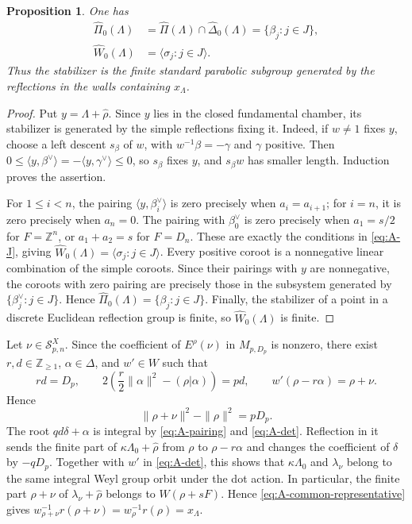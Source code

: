 \documentclass[11pt,a4paper]{amsart}
\newcommand{\ZZ}{\mathbb Z}
\theoremstyle{plain}
\newtheorem{prop}[theorem]{Proposition}
\numberwithin{equation}{section}
\newenvironment{pf}{\begin{proof}}{\end{proof}}
\begin{document}
\begin{prop}\label{prop:A-stabilizer}
One has
\[
\begin{aligned}
\widehat\Pi_0(\Lambda)
&=\widehat\Pi(\Lambda)\cap\widehat\Delta_0(\Lambda)
=\{\beta_j:j\in J\},\\
\widehat W_0(\Lambda)&=\langle\sigma_j:j\in J\rangle.
\end{aligned}
\]
Thus the stabilizer is the finite standard parabolic subgroup
generated by the reflections in the walls containing \(x_\Lambda\).
\end{prop}
\begin{pf}
Put \(y=\Lambda+\widehat\rho\). Since \(y\) lies in the closed
fundamental chamber, its stabilizer is generated by the simple
reflections fixing it. Indeed, if \(w\ne1\) fixes \(y\), choose
a left descent \(s_\beta\) of \(w\), with
\(w^{-1}\beta=-\gamma\) and \(\gamma\) positive. Then
\(0\le\langle y,\beta^\vee\rangle
=-\langle y,\gamma^\vee\rangle\le0\), so \(s_\beta\) fixes
\(y\), and \(s_\beta w\) has smaller length. Induction proves the
assertion.

For \(1\le i<n\), the pairing \(\langle y,\beta_i^\vee\rangle\)
is zero precisely when \(a_i=a_{i+1}\); for \(i=n\), it is zero
precisely when \(a_n=0\). The pairing with \(\beta_0^\vee\) is zero
precisely when \(a_1=s/2\) for \(F=\ZZ^n\), or
\(a_1+a_2=s\) for \(F=D_n\). These are exactly the conditions
in \eqref{eq:A-J}, giving
\(\widehat W_0(\Lambda)=\langle\sigma_j:j\in J\rangle\).
Every positive coroot is a nonnegative linear combination of the
simple coroots. Since their pairings with \(y\) are nonnegative,
the coroots with zero pairing are precisely those in the subsystem
generated by \(\{\beta_j^\vee:j\in J\}\). Hence
\(\widehat\Pi_0(\Lambda)=\{\beta_j:j\in J\}\).
Finally, the stabilizer of a point in a discrete Euclidean reflection
group is finite, so \(\widehat W_0(\Lambda)\) is finite.
\end{pf}

Let \(\nu\in\mathcal S^X_{p,n}\).
Since the coefficient of \(E^\rho(\nu)\) in \(M_{p,D_p}\)
is nonzero, there exist \(r,d\in\ZZ_{\ge1}\),
\(\alpha\in\Delta\), and \(w'\in W\) such that
\begin{equation}
rd=D_p,\qquad
2\left(\frac r2\|\alpha\|^2-(\rho|\alpha)\right)=pd,
\qquad
w'(\rho-r\alpha)=\rho+\nu.
\label{eq:A-det}
\end{equation}
Hence
\begin{equation}
\|\rho+\nu\|^2-\|\rho\|^2=pD_p.
\label{eq:A-norm}
\end{equation}
The root \(qd\delta+\alpha\) is integral by
\eqref{eq:A-pairing} and \eqref{eq:A-det}. Reflection in it sends the
finite part of \(\kappa\Lambda_0+\widehat\rho\) from \(\rho\) to
\(\rho-r\alpha\) and changes the coefficient of \(\delta\) by
\(-qD_p\). Together with \(w'\) in \eqref{eq:A-det}, this shows that
\(\kappa\Lambda_0\) and \(\lambda_\nu\) belong to the same integral
Weyl group orbit under the dot action.
In particular, the finite part \(\rho+\nu\) of
\(\lambda_\nu+\widehat\rho\) belongs to
\(W(\rho+sF)\). Hence \eqref{eq:A-common-representative} gives
\(w_{\rho+\nu}^{-1}r(\rho+\nu)=w_\rho^{-1}r(\rho)=x_\Lambda\).
\end{document}
